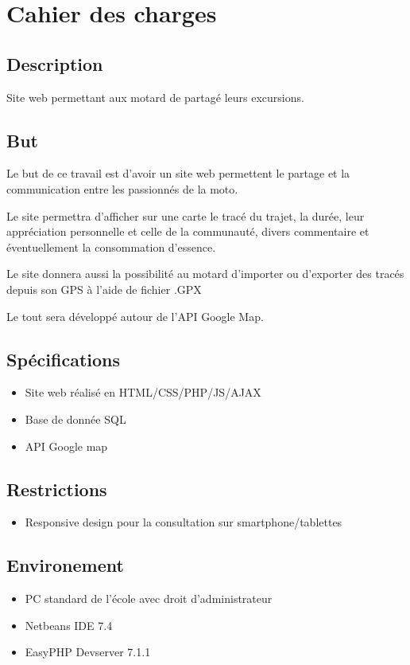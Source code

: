 \documentclass[a4paper]{article}
\begin{document}
\section{Cahier des charges}

\subsection{Description}
Site web permettant aux motard de partagé leurs excursions. 

\subsection{But}
Le but de ce travail est d'avoir un site web permettent le partage et la communication entre les passionnés de la moto.

Le site permettra d'afficher sur une carte le tracé du trajet, la durée, leur appréciation personnelle et celle de la communauté, divers commentaire et éventuellement la consommation d'essence.

Le site donnera aussi la possibilité au motard d'importer ou d'exporter des tracés depuis son GPS à l'aide de fichier .GPX

Le tout sera développé autour de l'API Google Map.

\subsection{Spécifications}

\begin{itemize}
	\item Site web réalisé en HTML/CSS/PHP/JS/AJAX
	\item Base de donnée SQL
	\item API Google map
\end{itemize}

\subsection{Restrictions}
\begin{itemize}
	\item Responsive design pour la consultation sur smartphone/tablettes
\end{itemize}



\subsection{Environement}
\begin{itemize}
	\item PC standard de l'école avec droit d'administrateur
	\item Netbeans IDE 7.4
	\item EasyPHP Devserver 7.1.1
\end{itemize}
\end{document}
